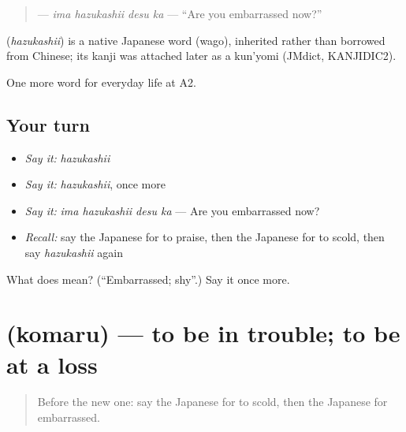 \begin{quote}
\textbf{ } — \emph{ima hazukashii desu ka} — \textquotedblleft{}Are you embarrassed now?\textquotedblright{}
\end{quote}

\begin{cousinweb}
\textbf{} (\emph{hazukashii}) is a native Japanese word (wago), inherited rather than borrowed from Chinese; its kanji was attached later as a kun'yomi (JMdict, KANJIDIC2).
\end{cousinweb}

\begin{grammarlens}[title={What you've built}]
One more word for everyday life at A2.
\end{grammarlens}

\subsection*{Your turn}
\begin{itemize}
\raggedright
  \item \emph{Say it:} \emph{hazukashii}
  \item \emph{Say it:} \emph{hazukashii}, once more
  \item \emph{Say it:} \emph{ima hazukashii desu ka} — Are you embarrassed now?
  \item \emph{Recall:} say the Japanese for to praise, then the Japanese for to scold, then say \emph{hazukashii} again
\end{itemize}

\begin{tcolorbox}[breakable,colback=teal!4,colframe=teal!35!black,title={Before you move on}]
What does  mean? (\textquotedblleft{}Embarrassed; shy\textquotedblright{}.) Say it once more.
\end{tcolorbox}
\section[\texorpdfstring{\ja{こまる} (komaru)}{こまる (komaru)}]{ (komaru) — to be in trouble; to be at a loss}

\label{lesson:JA-C247-komaru}



\begin{quote}
Before the new one: say the Japanese for to scold, then the Japanese for embarrassed.
\end{quote}

